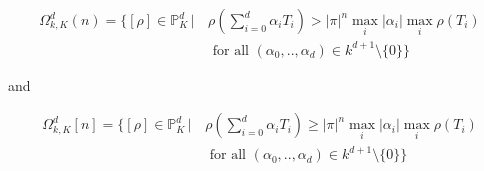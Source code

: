 \documentclass{amsart}
\theoremstyle{theorem}
\theoremstyle{lemma}
\theoremstyle{prop}
\theoremstyle{definition}
\theoremstyle{corollary}
\theoremstyle{remark}
\newcommand{\PR}{\mathbb{P}}
\begin{document}
\begin{equation*}
\begin{split}
\Omega^{d}_{k,K}(n)= \Big \{   [\rho]\in \PR^d_K \, | \, & \rho (\sum_{i=0}^{d}\alpha_i T_i  ) > |\pi|^n   \max_i {|\alpha_i|}
\max_i {\rho(T_i)}  \\
 & \text{ for all } (\alpha_0,..,\alpha_{d})\in k^{d+1} \setminus \{0\} \Big \} 
\end{split}
\end{equation*}

and

\begin{equation*}
\begin{split}
\Omega^{d}_{k,K}[n]=\Big \{   [\rho]\in \PR^d_K \, | \, & \rho(\sum_{i=0}^{d}\alpha_i T_i) \geq |\pi|^n   \max_i {|\alpha_i|}
\max_i {\rho(T_i)}  \\
 & \text{ for all } (\alpha_0,..,\alpha_{d})\in k^{d+1} \setminus \{0\}\Big \} 
\end{split}
\end{equation*}
\end{document}
